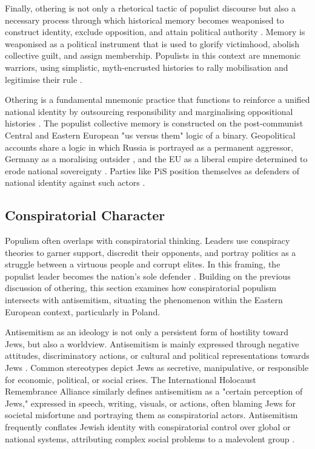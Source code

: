 Finally, othering is not only a rhetorical tactic of populist discourse but also a necessary process through which historical memory becomes weaponised to construct identity, exclude opposition, and attain political authority \citep{subotic_political_2018}. Memory is weaponised as a political instrument that is used to glorify victimhood, abolish collective guilt, and assign membership. Populists in this context are mnemonic warriors, using simplistic, myth-encrusted histories to rally mobilisation and legitimise their rule \citep{bernhard_notitle_2014}.

Othering is a fundamental mnemonic practice that functions to reinforce a unified national identity by outsourcing responsibility and marginalising oppositional histories \citep{subotic_political_2018}. The populist collective memory is constructed on the post-communist Central and Eastern European "us versus them" logic of a binary. Geopolitical accounts share a logic in which Russia is portrayed as a permanent aggressor, Germany as a moralising outsider \citep{riedel_tri-marium_2022}, and the EU as a liberal empire determined to erode national sovereignty \citep{verovsek_caught_2021}. Parties like PiS position themselves as defenders of national identity against such actors \citep{subotic_political_2018}.

\subsection{Conspiratorial Character}

Populism often overlaps with conspiratorial thinking. Leaders use conspiracy theories to garner support, discredit their opponents, and portray politics as a struggle between a virtuous people and corrupt elites. In this framing, the populist leader becomes the nation's sole defender \citep{mudde_populism_2017}. Building on the previous discussion of othering, this section examines how conspiratorial populism intersects with antisemitism, situating the phenomenon within the Eastern European context, particularly in Poland.

Antisemitism as an ideology is not only a persistent form of hostility toward Jews, but also a worldview. Antisemitism is mainly expressed through negative attitudes, discriminatory actions, or cultural and political representations towards Jews \citep{postone_anti-semitism_1980}. Common stereotypes depict Jews as secretive, manipulative, or responsible for economic, political, or social crises. The International Holocaust Remembrance Alliance similarly defines antisemitism as a "certain perception of Jews," expressed in speech, writing, visuals, or actions, often blaming Jews for societal misfortune and portraying them as conspiratorial actors. Antisemitism frequently conflates Jewish identity with conspiratorial control over global or national systems, attributing complex social problems to a malevolent group \citep{ihra_ihra-non-legally-binding-working-definition--antisemitism-1_2016}.

